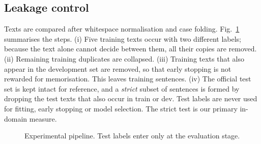 \documentclass[conference]{IEEEtran}
\begin{document}
\subsection{Leakage control}
Texts are compared after whitespace normalisation and case folding. Fig.~\ref{fig:pipeline} summarises the steps. (i) Five training texts occur with two different labels; because the text alone cannot decide between them, all their copies are removed. (ii) Remaining training duplicates are collapsed. (iii) Training texts that also appear in the development set are removed, so that early stopping is not rewarded for memorisation. This leaves \nTrain{} training sentences. (iv) The official test set is kept intact for reference, and a \emph{strict} subset of \nStrict{} sentences is formed by dropping the \nSeen{} test texts that also occur in train or dev. Test labels are never used for fitting, early stopping or model selection. The strict test is our primary in-domain measure.

\begin{figure}[t]
\centering
{}
\caption{Experimental pipeline. Test labels enter only at the evaluation stage.}
\label{fig:pipeline}
\end{figure}
\end{document}
